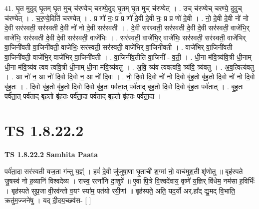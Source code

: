 \documentclass[17pt]{extarticle}
\begin{document}
41. घृ॒त मुदुद् घृ॒तम् घृ॒त मुच् च॑रण्येच् चरण्ये॒दुद् घृ॒तम् घृ॒त मुच् च॑रण्येत् । . उच् च॑रण्येच् चरण्ये॒ दुदुच् च॑रण्येत् । . च॒र॒ण्ये॒दिति॑ चरण्येत् । . प्र णो॑ नः॒ प्र प्र णो॑ दे॒वी दे॒वी नः॒ प्र प्र णो॑ दे॒वी । . नो॒ दे॒वी दे॒वी नो॑ नो दे॒वी सर॑स्वती॒ सर॑स्वती दे॒वी नो॑ नो दे॒वी सर॑स्वती । . दे॒वी सर॑स्वती॒ सर॑स्वती दे॒वी दे॒वी सर॑स्वती॒ वाजे॑भि॒र् वाजे॑भिः॒ सर॑स्वती दे॒वी दे॒वी सर॑स्वती॒ वाजे॑भिः । . सर॑स्वती॒ वाजे॑भि॒र् वाजे॑भिः॒ सर॑स्वती॒ सर॑स्वती॒ वाजे॑भिर् वा॒जिनी॑वती वा॒जिनी॑वती॒ वाजे॑भिः॒ सर॑स्वती॒ सर॑स्वती॒ वाजे॑भिर् वा॒जिनी॑वती । . वाजे॑भिर् वा॒जिनी॑वती वा॒जिनी॑वती॒ वाजे॑भि॒र् वाजे॑भिर् वा॒जिनी॑वती । . वा॒जिनी॑व॒तीति॑ वा॒जिनी᳚ - व॒ती॒ । . धी॒ना म॑वि॒त्र्य॑वि॒त्री धी॒नाम् धी॒ना म॑वि॒त्र्य॑व त्वव त्ववि॒त्री धी॒नाम् धी॒ना म॑वि॒त्र्य॑वतु । . अ॒वि॒ त्र्य॑व त्ववत्ववि॒ त्र्य॑वि॒ त्र्य॑वतु । . अ॒व॒त्वित्य॑वतु । . आ नो॑ न॒ आ नो॑ दि॒वो दि॒वो न॒ आ नो॑ दि॒वः । . नो॒ दि॒वो दि॒वो नो॑ नो दि॒वो बृ॑ह॒तो बृ॑ह॒तो दि॒वो नो॑ नो दि॒वो बृ॑ह॒तः । . दि॒वो बृ॑ह॒तो बृ॑ह॒तो दि॒वो दि॒वो बृ॑ह॒तः पर्व॑ता॒त् पर्व॑ताद् बृह॒तो दि॒वो दि॒वो बृ॑ह॒तः पर्व॑तात् । . बृ॒ह॒तः पर्व॑ता॒त् पर्व॑ताद् बृह॒तो बृ॑ह॒तः पर्व॑ता॒दा पर्व॑ताद् बृह॒तो बृ॑ह॒तः पर्व॑ता॒दा । \newline
\pagebreak
{}
\section*{ TS 1.8.22.2 }

\textbf{TS 1.8.22.2 } \newline
\textbf{Samhita Paata} \newline

पर्व॑ता॒दा सर॑स्वती यज॒ता ग॑न्तु य॒ज्ञ्ं । हवं॑ दे॒वी जु॑जुषा॒णा घृ॒ताची॑ श॒ग्मां नो॒ वाच॑मुश॒ती शृ॑णोतु ॥ बृह॑स्पते जु॒षस्व॑ नो ह॒व्यानि॑ विश्वदेव्य । रास्व॒ रत्ना॑नि दा॒शुषे᳚ ॥ ए॒वा पि॒त्रे वि॒श्वदे॑वाय॒ वृष्णे॑ य॒ज्ञिर् वि॑धेम॒ नम॑सा ह॒विर्भिः॑ । बृह॑स्पते सुप्र॒जा वी॒रव॑न्तो व॒यꣳ स्या॑म॒ पत॑यो रयी॒णां ॥ बृह॑स्पते॒ अति॒ यद॒र्यो अर्.हा᳚द् द्यु॒मद् वि॒भाति॒ क्रतु॑म॒ज्जने॑षु । यद् दी॒दय॒च्छव॑स- [ ] \newline
\end{document}
